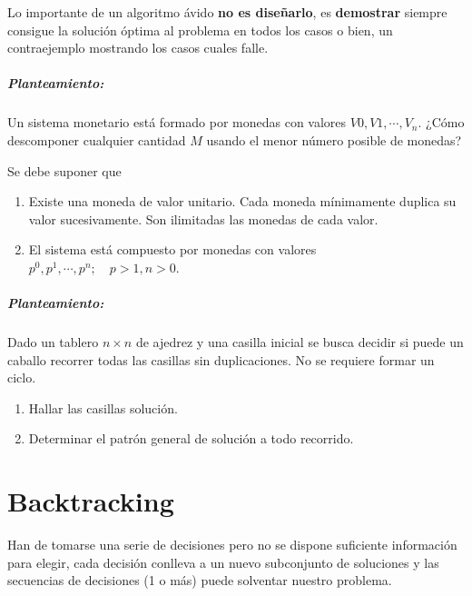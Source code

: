 \documentclass[tikz,11pt,fleqn]{book} %
\begin{document}
Lo importante de un algoritmo ávido \textbf{no es diseñarlo}, es \textbf{demostrar} siempre consigue la solución óptima al problema en todos los casos o bien, un contraejemplo mostrando los casos cuales falle.

\begin{example}
    \paragraph{Planteamiento:}
    \begin{definition}
        Un sistema monetario está formado por monedas con valores $V0, V1, \cdots, V_n$. ¿Cómo descomponer cualquier cantidad $M$ usando el menor número posible de monedas?
    
        Se debe suponer que
        \begin{enumerate}
            \item Existe una moneda de valor unitario. Cada moneda mínimamente duplica su valor sucesivamente. Son ilimitadas las monedas de cada valor.
            \item El sistema está compuesto por monedas con valores $p^0,p^1,\cdots,p^n;\quad p>1,n>0$. 
        \end{enumerate}
    \end{definition}
\end{example}

\begin{example}
    \paragraph{Planteamiento:}
    \begin{definition}
        Dado un tablero $n\times n$ de ajedrez y una casilla inicial se busca decidir si puede un caballo recorrer todas las casillas sin duplicaciones. No se requiere formar un ciclo.
        \begin{enumerate}
            \item Hallar las casillas solución.
            \item Determinar el patrón general de solución a todo recorrido.
        \end{enumerate}
    \end{definition}
\end{example}

\chapter{Backtracking}
Han de tomarse una serie de decisiones pero no se dispone suficiente información para elegir, cada decisión conlleva a un nuevo subconjunto de soluciones y las secuencias de decisiones (1 o más) puede solventar nuestro problema.
\end{document}
